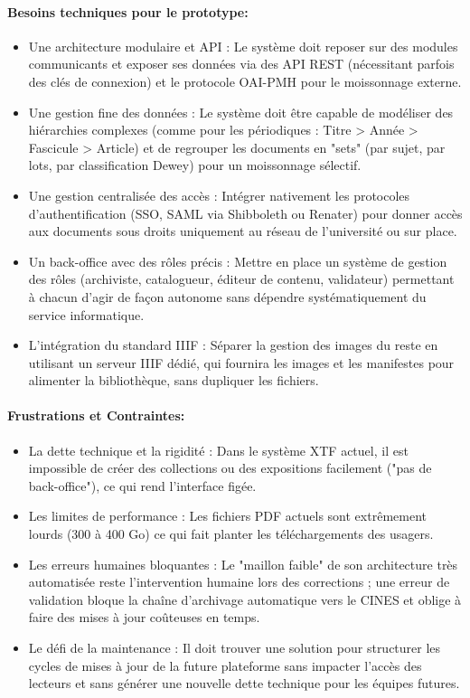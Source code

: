 \paragraph*{Besoins techniques pour le prototype:}
\begin{itemize}
	\item Une architecture modulaire et API : Le système doit reposer sur des modules communicants et exposer ses données via des API REST (nécessitant parfois des clés de connexion) et le protocole OAI-PMH pour le moissonnage externe.
\item Une gestion fine des données : Le système doit être capable de modéliser des hiérarchies complexes (comme pour les périodiques : Titre > Année > Fascicule > Article) et de regrouper les documents en "sets" (par sujet, par lots, par classification Dewey) pour un moissonnage sélectif.
\item Une gestion centralisée des accès : Intégrer nativement les protocoles d'authentification (SSO, SAML via Shibboleth ou Renater) pour donner accès aux documents sous droits uniquement au réseau de l'université ou sur place.
\item Un back-office avec des rôles précis : Mettre en place un système de gestion des rôles (archiviste, catalogueur, éditeur de contenu, validateur) permettant à chacun d'agir de façon autonome sans dépendre systématiquement du service informatique.
\item L'intégration du standard IIIF : Séparer la gestion des images du reste en utilisant un serveur IIIF dédié, qui fournira les images et les manifestes pour alimenter la bibliothèque, sans dupliquer les fichiers.
\end{itemize}
\paragraph*{Frustrations et Contraintes:}
\begin{itemize}
	\item La dette technique et la rigidité : Dans le système XTF actuel, il est impossible de créer des collections ou des expositions facilement ("pas de back-office"), ce qui rend l'interface figée.
\item Les limites de performance : Les fichiers PDF actuels sont extrêmement lourds (300 à 400 Go) ce qui fait planter les téléchargements des usagers.
\item Les erreurs humaines bloquantes : Le "maillon faible" de son architecture très automatisée reste l'intervention humaine lors des corrections ; une erreur de validation bloque la chaîne d'archivage automatique vers le CINES et oblige à faire des mises à jour coûteuses en temps.
\item Le défi de la maintenance : Il doit trouver une solution pour structurer les cycles de mises à jour de la future plateforme sans impacter l'accès des lecteurs et sans générer une nouvelle dette technique pour les équipes futures.
\end{itemize}